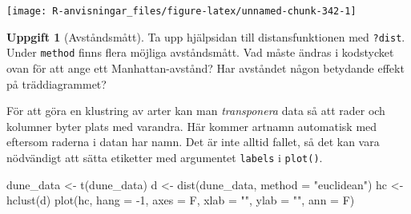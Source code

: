 \documentclass[
]{book}
\newenvironment{Shaded}{\begin{snugshade}}{\end{snugshade}}
\newcommand{\AttributeTok}[1]{\textcolor[rgb]{0.77,0.63,0.00}{#1}}
\newcommand{\DecValTok}[1]{\textcolor[rgb]{0.00,0.00,0.81}{#1}}
\newcommand{\FunctionTok}[1]{\textcolor[rgb]{0.00,0.00,0.00}{#1}}
\newcommand{\NormalTok}[1]{#1}
\newcommand{\OtherTok}[1]{\textcolor[rgb]{0.56,0.35,0.01}{#1}}
\newcommand{\SpecialCharTok}[1]{\textcolor[rgb]{0.00,0.00,0.00}{#1}}
\newcommand{\StringTok}[1]{\textcolor[rgb]{0.31,0.60,0.02}{#1}}
\theoremstyle{definition}
\theoremstyle{definition}
\theoremstyle{definition}
\newtheorem{exercise}{Uppgift}[chapter]
\theoremstyle{definition}
\theoremstyle{remark}
\begin{document}
\begin{Shaded}
\end{Shaded}

\begin{center}\texttt{[image: R-anvisningar\_files/figure-latex/unnamed-chunk-342-1]} \end{center}

\begin{exercise}[Avståndsmått]
Ta upp hjälpsidan till distansfunktionen med \texttt{?dist}. Under \texttt{method} finns flera möjliga avståndsmått. Vad måste ändras i kodstycket ovan för att ange ett Manhattan-avstånd? Har avståndet någon betydande effekt på träddiagrammet?
\end{exercise}

För att göra en klustring av arter kan man \emph{transponera} data så att rader och kolumner byter plats med varandra. Här kommer artnamn automatisk med eftersom raderna i datan har namn. Det är inte alltid fallet, så det kan vara nödvändigt att sätta etiketter med argumentet \texttt{labels} i \texttt{plot()}.

\begin{Shaded}
\begin{Highlighting}[]
\NormalTok{dune\_data }\OtherTok{\textless{}{-}} \FunctionTok{t}\NormalTok{(dune\_data)}
\NormalTok{d }\OtherTok{\textless{}{-}} \FunctionTok{dist}\NormalTok{(dune\_data, }\AttributeTok{method =} \StringTok{"euclidean"}\NormalTok{)}
\NormalTok{hc }\OtherTok{\textless{}{-}} \FunctionTok{hclust}\NormalTok{(d)}
\FunctionTok{plot}\NormalTok{(hc, }\AttributeTok{hang =} \SpecialCharTok{{-}}\DecValTok{1}\NormalTok{,}
     \AttributeTok{axes =}\NormalTok{ F, }\AttributeTok{xlab =} \StringTok{""}\NormalTok{, }\AttributeTok{ylab =} \StringTok{""}\NormalTok{, }\AttributeTok{ann =}\NormalTok{ F)}
\end{Highlighting}
\end{Shaded}
\end{document}
